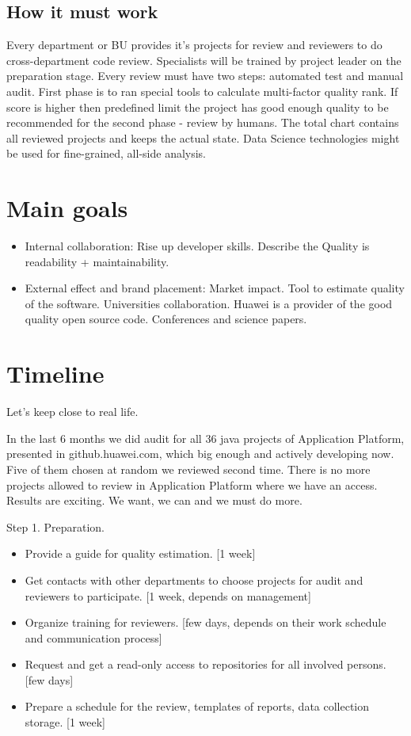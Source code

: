 \documentclass[12pt,oneside]{article}
\begin{document}
\subsection{How it must work}
	Every department or BU provides it's projects for review and reviewers to do cross-department code review. Specialists will be trained by project leader on the preparation stage.
	Every review must have two steps: automated test and manual audit. First phase is to ran special tools to calculate multi-factor quality rank. If score is higher then predefined limit the project  has good enough quality to be recommended for the second phase - review by humans.
	The total chart contains all reviewed projects and keeps the actual state.
	Data Science technologies might be used for fine-grained, all-side analysis.

\section{Main goals}
\label{sec:goals}

\begin{itemize}
\item Internal collaboration:
    \subitem Rise up developer skills. Describe the Quality is readability + maintainability.
	
\item External effect and brand placement:
	\subitem  Market impact. Tool to estimate quality of the software.
	\subitem  Universities collaboration.
	\subitem  Huawei is a provider of the good quality open source code.
	\subitem  Conferences and science papers.
\end{itemize}

\section{Timeline}
\label{sec:timeline}

Let's keep close to real life.

In the last 6 months we did audit for all 36 java projects of Application Platform, presented in github.huawei.com, which big enough and actively developing now. Five of them chosen at random we reviewed second time. There is no more projects allowed to review in Application Platform where we have an access. Results are exciting. We want, we can and we must do more.
	
Step 1. Preparation.
\begin{itemize}
\item Provide a guide for quality estimation. [1 week]
\item Get contacts with other departments to choose projects for audit and reviewers to participate. [1 week, depends on management]
\item Organize training for reviewers. [few days, depends on their work schedule and communication process]
\item Request and get a read-only access to repositories for all involved persons. [few days]
\item Prepare a schedule for the review, templates of reports, data collection storage. [1 week]
\end{itemize}
\end{document}
